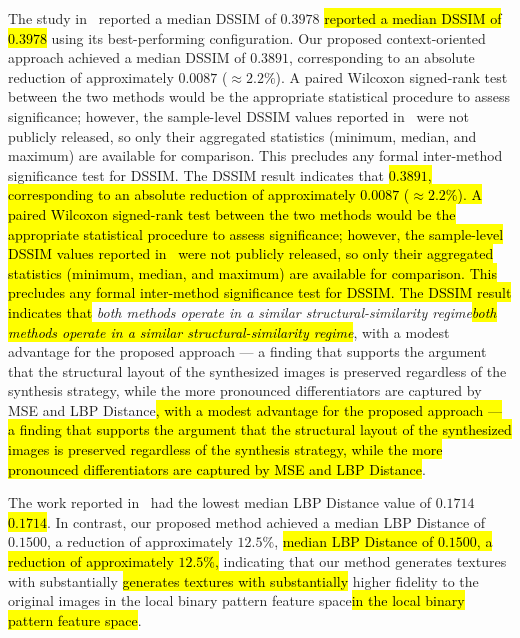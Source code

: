 \documentclass{ieeeaccess}
\makeatletter
\DeclareRobustCommand{\DIFaddbegin}{\DIFOaddbegin \let\includegraphics\DIFaddincludegraphics} %
\DeclareRobustCommand{\DIFaddend}{\DIFOaddend \let\includegraphics\DIFOincludegraphics} %
\DeclareRobustCommand{\DIFdelbegin}{\DIFOdelbegin \let\includegraphics\DIFdelincludegraphics} %
\DeclareRobustCommand{\DIFdelend}{\DIFOaddend \let\includegraphics\DIFOincludegraphics} %
\let\sout@orig\sout %
\renewcommand{\sout}[1]{\ifmmode\text{\sout@orig{\ensuremath{#1}}}\else\sout@orig{#1}\fi} %
\providecommand{\DIFadd}[1]{{\protect\color{blue}#1}}
\providecommand{\DIFdel}[1]{{\protect\color{red}\sout{#1}}}
\renewcommand{\DIFadd}[1]{\ifmmode#1\else\begingroup\let\protect\relax\hl{#1}\endgroup\fi}
\renewcommand{\DIFdel}[1]{}
\providecommand{\DIFaddbegin}{}
\providecommand{\DIFaddend}{}
\providecommand{\DIFdelbegin}{}
\providecommand{\DIFdelend}{}
\renewcommand{\DIFaddbegin}{}
\renewcommand{\DIFaddend}{}
\renewcommand{\DIFdelbegin}{}
\renewcommand{\DIFdelend}{}
\makeatother
\begin{document}
\DIFdelbegin \DIFdel{In }\DIFdelend The study in~\cite{Ferreira2020} \DIFdelbegin \DIFdel{, the median DSSIM achieved $0.39$ }\DIFdelend \DIFaddbegin \DIFadd{reported a median DSSIM of $0.3978$ }\DIFaddend using its best-performing configuration. Our proposed context-oriented approach achieved a median DSSIM of \DIFdelbegin \DIFdel{$0.389125$. While the improvement in terms of DSSIM is modest, it still suggests a better structural similarity between the synthetic and original images as compared to the approach in~\cite{Ferreira2020}}\DIFdelend \DIFaddbegin \DIFadd{$0.3891$, corresponding to an absolute reduction of approximately $0.0087$ ($\approx 2.2\%$). A paired Wilcoxon signed-rank test between the two methods would be the appropriate statistical procedure to assess significance; however, the sample-level DSSIM values reported in~\cite{Ferreira2020} were not publicly released, so only their aggregated statistics (minimum, median, and maximum) are available for comparison. This precludes any formal inter-method significance test for DSSIM. The DSSIM result indicates that }\emph{\DIFadd{both methods operate in a similar structural-similarity regime}}\DIFadd{, with a modest advantage for the proposed approach --- a finding that supports the argument that the structural layout of the synthesized images is preserved regardless of the synthesis strategy, while the more pronounced differentiators are captured by MSE and LBP Distance}\DIFaddend .
\DIFdelbegin \DIFdel{The relatively small difference in DSSIM suggests that both methods are capable of capturing the overall structure of the seismic images , but our proposed method may have an advantage in terms of providing finer details.
}\DIFdelend 

The work reported in~\cite{Ferreira2020} had the lowest median LBP Distance value of \DIFdelbegin \DIFdel{$0.17$}\DIFdelend \DIFaddbegin \DIFadd{$0.1714$}\DIFaddend . In contrast, our proposed method achieved a \DIFdelbegin \DIFdel{LBP Distance median of $0.150075$, }\DIFdelend \DIFaddbegin \DIFadd{median LBP Distance of $0.1500$, a reduction of approximately $12.5\%$, }\DIFaddend indicating that our method \DIFdelbegin \DIFdel{tends to generate textures with }\DIFdelend \DIFaddbegin \DIFadd{generates textures with substantially }\DIFaddend higher fidelity to the original images \DIFaddbegin \DIFadd{in the local binary pattern feature space}\DIFaddend .
\end{document}
